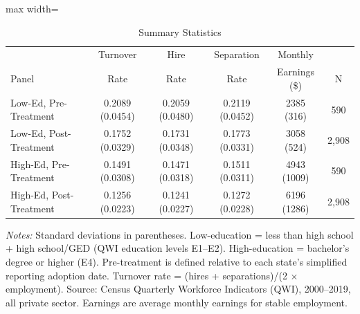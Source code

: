 \begin{table}[htbp]
\centering
\caption{Summary Statistics}
\label{tab:summary}
\begin{adjustbox}{max width=\textwidth}
\begin{tabular}{lccccc}
\toprule
 & Turnover & Hire & Separation & Monthly & \\
Panel & Rate & Rate & Rate & Earnings (\$) & N \\
\midrule
Low-Ed, Pre-Treatment & 0.2089 (0.0454) & 0.2059 (0.0480) & 0.2119 (0.0452) & 2385 (316) & 590 \\
Low-Ed, Post-Treatment & 0.1752 (0.0329) & 0.1731 (0.0348) & 0.1773 (0.0331) & 3058 (524) & 2,908 \\
High-Ed, Pre-Treatment & 0.1491 (0.0308) & 0.1471 (0.0318) & 0.1511 (0.0311) & 4943 (1009) & 590 \\
High-Ed, Post-Treatment & 0.1256 (0.0223) & 0.1241 (0.0227) & 0.1272 (0.0228) & 6196 (1286) & 2,908 \\
\bottomrule
\end{tabular}
\end{adjustbox}
\begin{tablenotes}[flushleft]
\small
\item \textit{Notes:} Standard deviations in parentheses. Low-education = less than high school + high school/GED (QWI education levels E1--E2). High-education = bachelor's degree or higher (E4). Pre-treatment is defined relative to each state's simplified reporting adoption date. Turnover rate = (hires + separations)/(2 $\times$ employment). Source: Census Quarterly Workforce Indicators (QWI), 2000--2019, all private sector. Earnings are average monthly earnings for stable employment.
\end{tablenotes}
\end{table}

